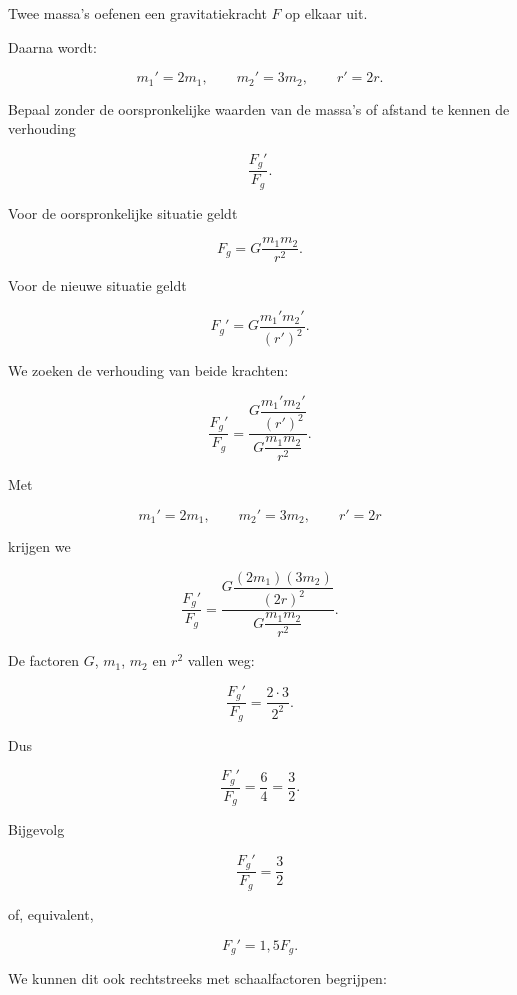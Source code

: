 \documentclass{ximera}
\begin{document}
\begin{oefening}{\oefU\ESS}

Twee massa's oefenen een gravitatiekracht $F$ op elkaar uit.

Daarna wordt:

\[
m_1'=2m_1,
\qquad
m_2'=3m_2,
\qquad
r'=2r.
\]

Bepaal zonder de oorspronkelijke waarden van de massa's of afstand te
kennen de verhouding

\[
\frac{F_g'}{F_g}.
\]

\begin{oplossing}

      Voor de oorspronkelijke situatie geldt
      
      \[
      F_g
      =
      G\frac{m_1m_2}{r^2}.
      \]
      
      Voor de nieuwe situatie geldt
      
      \[
      F_g'
      =
      G\frac{m_1'm_2'}{(r')^2}.
      \]
      
      We zoeken de verhouding van beide krachten:
      
      \[
      \frac{F_g'}{F_g}
      =
      \frac{
      G\dfrac{m_1'm_2'}{(r')^2}
      }{
      G\dfrac{m_1m_2}{r^2}
      }.
      \]
      
      Met
      
      \[
      m_1'=2m_1,
      \qquad
      m_2'=3m_2,
      \qquad
      r'=2r
      \]
      
      krijgen we
      
      \[
      \frac{F_g'}{F_g}
      =
      \frac{
      G\dfrac{(2m_1)(3m_2)}{(2r)^2}
      }{
      G\dfrac{m_1m_2}{r^2}
      }.
      \]
      
      De factoren $G$, $m_1$, $m_2$ en $r^2$ vallen weg:
      
      \[
      \frac{F_g'}{F_g}
      =
      \frac{2\cdot3}{2^2}.
      \]
      
      Dus
      
      \[
      \frac{F_g'}{F_g}
      =
      \frac64
      =
      \frac32.
      \]
      
      Bijgevolg
      
      \[
      \boxed{
      \frac{F_g'}{F_g}=\frac32
      }
      \]
      
      of, equivalent,
      
      \[
      \boxed{
      F_g'=1{,}5F_g.
      }
      \]
      
      We kunnen dit ook rechtstreeks met schaalfactoren begrijpen:
      

\end{oplossing}
\end{oefening}
\end{document}

